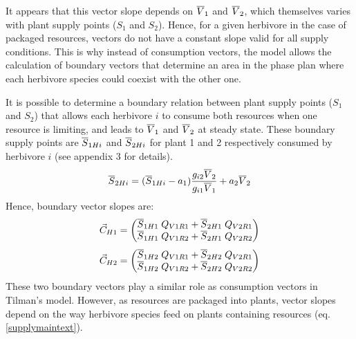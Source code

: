 \documentclass[12pt]{article}
\newcommand\barre[1]{\overline{\rule{0pt}{1.5ex}#1}}
\begin{document}
It appears that this vector slope depends on $\barre{V}_1$ and $\barre{V}_2$, which themselves varies with plant supply points ($S_1$ and $S_2$). 
Hence, for a given herbivore in the case of packaged resources, vectors do not have a constant slope valid for all supply conditions. This is why instead of consumption vectors, the model allows the calculation of boundary vectors that determine an area in the phase plan where each herbivore species could coexist with the other one. 
\par
It is possible to determine a boundary relation between plant supply points ($S_1$ and $S_2$) that allows each herbivore $i$ to consume both resources when one resource is limiting, and leads to $\barre{V}_1$ and $\barre{V}_2$ at steady state. These boundary supply points are $\barre{S}_{1Hi}$ and $\barre{S}_{2Hi}$ for plant 1 and 2 respectively consumed by herbivore $i$ (see appendix 3 for details). 
\begin{equation}\label{supplymaintext}
\barre{S}_{2Hi}=(\barre{S}_{1Hi}-a_1)\frac{g_{i2}\barre{V}_2}{g_{i1}\barre{V}_1}+a_2\barre{V}_2
\end{equation}
Hence, boundary vector slopes are:
\begin{equation}
\vec{C}_{H1}= 
\begin{pmatrix}
\barre{S}_{1H1} \;Q_{V1R1}+\barre{S}_{2H1}\; Q_{V2R1} \\
\barre{S}_{1H1}\; Q_{V1R2}+\barre{S}_{2H1}\; Q_{V2R2} \\
\end{pmatrix} 
\end{equation}
\begin{equation}
\vec{C}_{H2}= 
\begin{pmatrix}
\barre{S}_{1H2} \;Q_{V1R1}+\barre{S}_{2H2}\; Q_{V2R1} \\
\barre{S}_{1H2}\; Q_{V1R2}+\barre{S}_{2H2}\; Q_{V2R2} \\
\end{pmatrix} 
\end{equation}
These two boundary vectors play a similar role as consumption vectors in Tilman's model. However, as resources are packaged into plants, vector slopes depend on the way herbivore species feed on plants containing resources (eq. \ref{supplymaintext}).  
\end{document}
